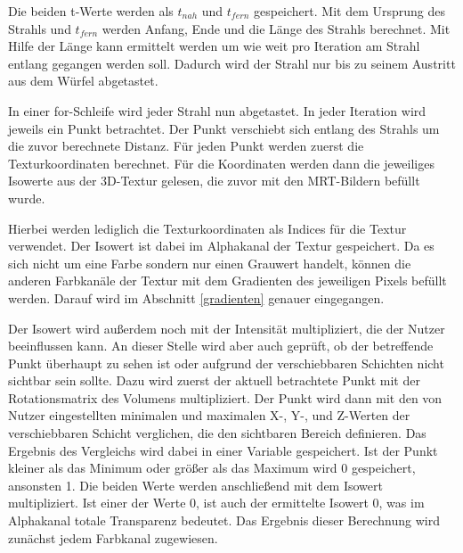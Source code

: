 Die beiden t-Werte werden als $t_{nah}$ und $t_{fern}$ gespeichert.
Mit dem Ursprung des Strahls und $t_{fern}$ werden Anfang, Ende und die Länge des Strahls berechnet. Mit Hilfe der Länge kann ermittelt werden um wie weit pro Iteration am Strahl entlang gegangen werden soll. Dadurch wird der Strahl nur bis zu seinem Austritt aus dem Würfel abgetastet. 

In einer for-Schleife wird jeder Strahl nun abgetastet. In jeder Iteration wird jeweils ein Punkt betrachtet. Der Punkt verschiebt sich entlang des Strahls um die zuvor berechnete Distanz.
Für jeden Punkt werden zuerst die Texturkoordinaten berechnet.
Für die Koordinaten werden dann die jeweiliges Isowerte aus der 3D-Textur gelesen, die zuvor mit den MRT-Bildern befüllt wurde.

Hierbei werden lediglich die Texturkoordinaten als Indices für die Textur verwendet. 
Der Isowert ist dabei im Alphakanal der Textur gespeichert. Da es sich nicht um eine Farbe sondern nur einen Grauwert handelt, können die anderen Farbkanäle der Textur mit dem Gradienten des jeweiligen Pixels befüllt werden. Darauf wird im Abschnitt \ref{gradienten} genauer eingegangen.

Der Isowert wird außerdem noch mit der Intensität multipliziert, die der Nutzer beeinflussen kann.
An dieser Stelle wird aber auch geprüft, ob der betreffende Punkt überhaupt zu sehen ist oder aufgrund der verschiebbaren Schichten nicht sichtbar sein sollte. 
Dazu wird zuerst der aktuell betrachtete Punkt mit der Rotationsmatrix des Volumens multipliziert.
Der Punkt wird dann mit den von Nutzer eingestellten minimalen und maximalen X-, Y-, und Z-Werten der verschiebbaren Schicht verglichen, die den sichtbaren Bereich definieren. Das Ergebnis des Vergleichs wird dabei in einer Variable gespeichert. Ist der Punkt kleiner als das Minimum oder größer als das Maximum wird 0 gespeichert, ansonsten 1. 
Die beiden Werte werden anschließend mit dem Isowert multipliziert. Ist einer der Werte 0, ist auch der ermittelte Isowert 0, was im Alphakanal totale Transparenz bedeutet. 
Das Ergebnis dieser Berechnung wird zunächst jedem Farbkanal zugewiesen.

